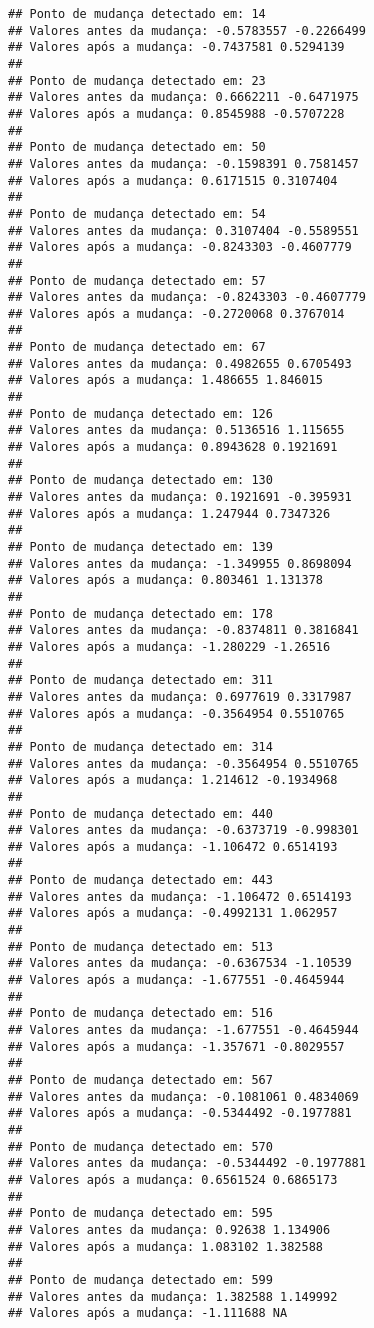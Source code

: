 \documentclass[
]{article}
\begin{document}
\begin{verbatim}
## Ponto de mudança detectado em: 14 
## Valores antes da mudança: -0.5783557 -0.2266499 
## Valores após a mudança: -0.7437581 0.5294139 
## 
## Ponto de mudança detectado em: 23 
## Valores antes da mudança: 0.6662211 -0.6471975 
## Valores após a mudança: 0.8545988 -0.5707228 
## 
## Ponto de mudança detectado em: 50 
## Valores antes da mudança: -0.1598391 0.7581457 
## Valores após a mudança: 0.6171515 0.3107404 
## 
## Ponto de mudança detectado em: 54 
## Valores antes da mudança: 0.3107404 -0.5589551 
## Valores após a mudança: -0.8243303 -0.4607779 
## 
## Ponto de mudança detectado em: 57 
## Valores antes da mudança: -0.8243303 -0.4607779 
## Valores após a mudança: -0.2720068 0.3767014 
## 
## Ponto de mudança detectado em: 67 
## Valores antes da mudança: 0.4982655 0.6705493 
## Valores após a mudança: 1.486655 1.846015 
## 
## Ponto de mudança detectado em: 126 
## Valores antes da mudança: 0.5136516 1.115655 
## Valores após a mudança: 0.8943628 0.1921691 
## 
## Ponto de mudança detectado em: 130 
## Valores antes da mudança: 0.1921691 -0.395931 
## Valores após a mudança: 1.247944 0.7347326 
## 
## Ponto de mudança detectado em: 139 
## Valores antes da mudança: -1.349955 0.8698094 
## Valores após a mudança: 0.803461 1.131378 
## 
## Ponto de mudança detectado em: 178 
## Valores antes da mudança: -0.8374811 0.3816841 
## Valores após a mudança: -1.280229 -1.26516 
## 
## Ponto de mudança detectado em: 311 
## Valores antes da mudança: 0.6977619 0.3317987 
## Valores após a mudança: -0.3564954 0.5510765 
## 
## Ponto de mudança detectado em: 314 
## Valores antes da mudança: -0.3564954 0.5510765 
## Valores após a mudança: 1.214612 -0.1934968 
## 
## Ponto de mudança detectado em: 440 
## Valores antes da mudança: -0.6373719 -0.998301 
## Valores após a mudança: -1.106472 0.6514193 
## 
## Ponto de mudança detectado em: 443 
## Valores antes da mudança: -1.106472 0.6514193 
## Valores após a mudança: -0.4992131 1.062957 
## 
## Ponto de mudança detectado em: 513 
## Valores antes da mudança: -0.6367534 -1.10539 
## Valores após a mudança: -1.677551 -0.4645944 
## 
## Ponto de mudança detectado em: 516 
## Valores antes da mudança: -1.677551 -0.4645944 
## Valores após a mudança: -1.357671 -0.8029557 
## 
## Ponto de mudança detectado em: 567 
## Valores antes da mudança: -0.1081061 0.4834069 
## Valores após a mudança: -0.5344492 -0.1977881 
## 
## Ponto de mudança detectado em: 570 
## Valores antes da mudança: -0.5344492 -0.1977881 
## Valores após a mudança: 0.6561524 0.6865173 
## 
## Ponto de mudança detectado em: 595 
## Valores antes da mudança: 0.92638 1.134906 
## Valores após a mudança: 1.083102 1.382588 
## 
## Ponto de mudança detectado em: 599 
## Valores antes da mudança: 1.382588 1.149992 
## Valores após a mudança: -1.111688 NA
\end{verbatim}
\end{document}
